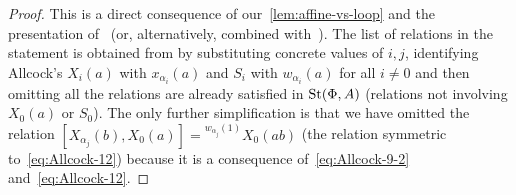 \begin{proof}
    This is a direct consequence of our~\cref{lem:affine-vs-loop} and the presentation of~\cite[Theorem~1]{A16} (or, alternatively, \cite[Theorem~1.1]{A13} combined with~\cite[Theorem~1.3]{A13}).
    The list of relations in the statement is obtained from \cite[Table~1]{A16} by substituting concrete values of $i, j$, identifying Allcock's $X_{i}(a)$ with
     $x_{\alpha_i}(a)$ and $S_i$ with $w_{\alpha_i}(a)$ for all $i\neq 0$ and then omitting all the relations are already satisfied in $\operatorname{St}(\Phi, A)$ (relations not involving $X_0(a)$ or $S_0$).
    The only further simplification is that we have omitted the relation $[X_{\alpha_j}(b), X_0(a)] = {}^{w_{\alpha_j}(1)} X_0(ab)$ (the relation symmetric to~\eqref{eq:Allcock-12})
    because it is a consequence of~\eqref{eq:Allcock-9-2} and~\eqref{eq:Allcock-12}.
\end{proof}

